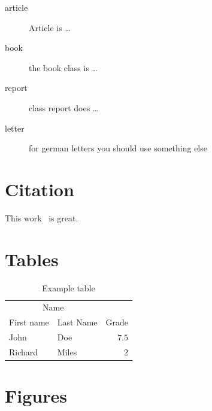 \begin{multicols}{2}
\begin{description}
	\item[article\label{article}]{Article is \ldots}
	\item[book\label{book}]{the book class is \ldots}
	\item[report\label{report}]{class report does \ldots}
	\item[letter\label{letter}]{for german letters you should use something else}
\end{description}
	



\section{Citation}\label{sec:cite}

This work~\cite{doe2006test} is great.

\section{Tables}\label{sec:tab}

\begin{table}[H]
	\caption{Example table}
	\centering
	\begin{tabular}{llr}
		\toprule
		\multicolumn{2}{c}{Name} \\
		\cmidrule(r){1-2}
		First name & Last Name & Grade \\
		\midrule
		John & Doe & $7.5$ \\
		Richard & Miles & $2$ \\
		\bottomrule
	\end{tabular}
\end{table}

\lipsum[5] %


\section{Figures}\label{sec:fig}


\end{multicols}
